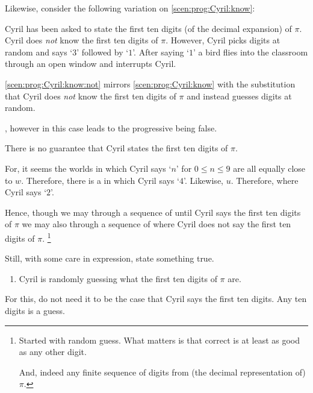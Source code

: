 \begin{note}
  Likewise, consider the following variation on \autoref{scen:prog:Cyril:know}:
  \begin{scenario}
    \label{scen:prog:Cyril:know:not}
    Cyril has been asked to state the first ten digits (of the decimal expansion) of \(\pi\).
    Cyril does \emph{not} know the first ten digits of \(\pi\).
    However, Cyril picks digits at random and says `\(3\)' followed by `\(1\)'.
    After saying `\(1\)' a bird flies into the classroom through an open window and interrupts Cyril.
  \end{scenario}

  \autoref{scen:prog:Cyril:know:not} mirrors \autoref{scen:prog:Cyril:know} with the substitution that Cyril does \emph{not} know the first ten digits of \(\pi\) and instead guesses digits at random.

  \drift{}, however in this case leads to the progressive being false.

  There is no guarantee that Cyril states the first ten digits of \(\pi\).

  For, it seems the worlds in which Cyril says `\(n\)' for \(0 \leq n \leq 9\) are all equally close to \(w\).
  Therefore, there is a  in which Cyril says `\(4\)'.
  Likewise, \(u\).
  Therefore,  where Cyril says `\(2\)'.

  Hence, though we may  through a sequence of  until Cyril says the first ten digits of \(\pi\) we may also  through a sequence of  where Cyril does not say the first ten digits of \(\pi\).%
  \footnote{
    Started with random guess.
    What matters is that correct is at least as good as any other digit.

    And, indeed any finite sequence of digits from (the decimal representation of) \(\pi\).
  }

  Still, with some care in expression, state something true.
  \begin{enumerate}[label=\arabic*., ref=(\arabic*), resume*=CyrilProg]
  \item
    Cyril is randomly guessing what the first ten digits of \(\pi\) are.
  \end{enumerate}
  For this, do not need it to be the case that Cyril says the first ten digits.
  Any ten digits is a guess.
\end{note}

